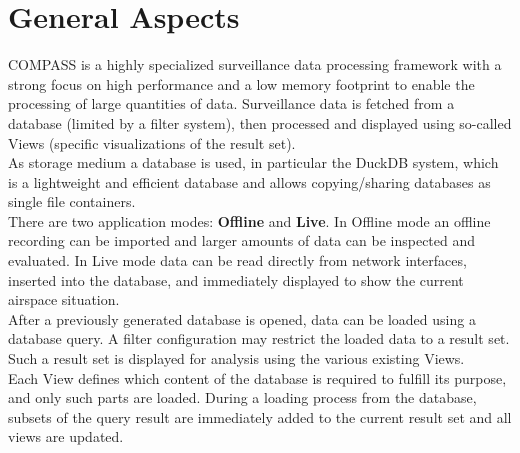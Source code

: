 \section{General Aspects}
COMPASS is a highly specialized surveillance data processing framework with a strong focus on high performance and a low memory footprint to enable the processing of large quantities of data. Surveillance data is fetched from a database (limited by a filter system), then processed and displayed using so-called Views (specific visualizations of the result set).\\

As storage medium a database is used, in particular the DuckDB system, which is a lightweight and efficient database and allows copying/sharing databases as single file containers. \\

There are two application modes: \textbf{Offline} and \textbf{Live}. In Offline mode an offline recording can be imported and larger amounts of data can be inspected and evaluated. 
In Live mode data can be read directly from network interfaces, inserted into the database, and immediately displayed to show the current airspace situation. \\

After a previously generated database is opened, data can be loaded using a database query. A filter configuration may restrict the loaded data to a result set. 
Such a result set is displayed for analysis using the various existing Views.\\

Each View defines which content of the database is required to fulfill its purpose, and only such parts are loaded. During a loading process from the database, subsets of the query result are immediately added to the current result set and all views are updated.
